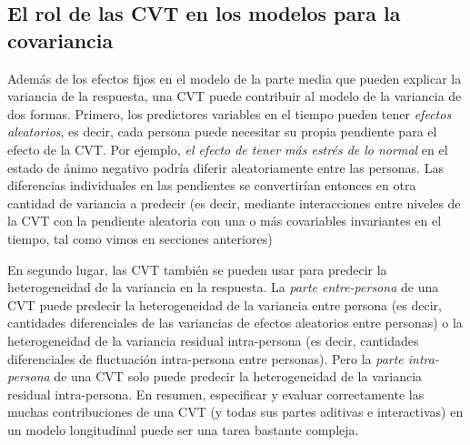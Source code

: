 \documentclass[spanish]{article}
\numberwithin{figure}{subsection}
\numberwithin{equation}{subsection}
\numberwithin{table}{subsection}
\begin{document}

\subsection{El rol de las CVT en los modelos para la covariancia}

Además de los efectos fijos en el modelo de la parte media que pueden explicar la variancia de la respuesta,
una CVT puede contribuir al modelo de la variancia de dos formas. Primero, los predictores variables en el tiempo
pueden tener \textit{efectos aleatorios}, es decir, cada persona puede necesitar su propia pendiente para el efecto
de la CVT. Por ejemplo, \textit{el efecto de tener más estrés de lo normal} en el estado de ánimo negativo podría
diferir aleatoriamente entre las personas. Las diferencias individuales en las pendientes se convertirían entonces
en otra cantidad de variancia a predecir (es decir, mediante interacciones entre niveles de la CVT con la pendiente
aleatoria con una o más covariables invariantes en el tiempo, tal como vimos en secciones anteriores)

En segundo lugar, las CVT también se pueden usar para predecir la heterogeneidad de la variancia en la respuesta.
La \textit{parte entre-persona} de una CVT puede predecir la heterogeneidad de la variancia entre persona (es decir,
cantidades diferenciales de las variancias de efectos aleatorios entre personas) o la heterogeneidad de la variancia
residual intra-persona (es decir, cantidades diferenciales de fluctuación intra-persona entre personas). Pero la
\textit{parte intra-persona} de una CVT solo puede predecir la heterogeneidad de la variancia residual intra-persona.
En resumen, especificar y evaluar correctamente las muchas contribuciones de una CVT (y todas sus partes aditivas e
interactivas) en un modelo longitudinal puede ser una tarea bastante compleja.


\newpage
\nocite{*}
\renewcommand{\refname}{Bibliografía}

\end{document}
